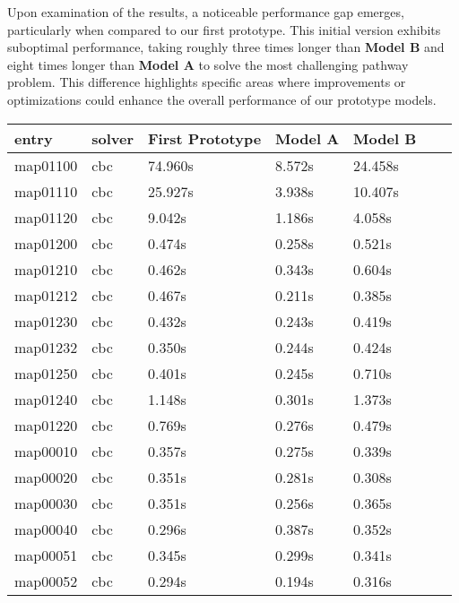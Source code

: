 Upon examination of the results, a noticeable performance gap emerges, particularly when compared to our first prototype. This initial version exhibits suboptimal performance, taking roughly three times longer than \textbf{Model B} and eight times longer than \textbf{Model A} to solve the most challenging pathway problem. This difference highlights specific areas where improvements or optimizations could enhance the overall performance of our prototype models.

\begin{table}[H]
\centering
\begin{tabular}{|l|l|l|l|l|l|l|}
\hline
\rowcolor[HTML]{C0C0C0} 
entry    & solver     & First Prototype & Model A & Model B  \\\hline
map01100 & cbc & 74.960s           & 8.572s        & 24.458s       \\\hline
map01110 & cbc & 25.927s          & 3.938s       & 10.407s       \\\hline
map01120 & cbc & 9.042s           & 1.186s       & 4.058s        \\\hline
map01200 & cbc & 0.474s         & 0.258s       & 0.521s        \\\hline
map01210 & cbc & 0.462s          & 0.343s      & 0.604s        \\\hline
map01212 & cbc & 0.467s          & 0.211s      & 0.385s       \\\hline
map01230 & cbc & 0.432s          & 0.243s      & 0.419s       \\\hline
map01232 & cbc & 0.350s          & 0.244s      & 0.424s      \\ \hline
map01250 & cbc & 0.401s          & 0.245s       & 0.710s       \\\hline
map01240 & cbc & 1.148s          & 0.301s       & 1.373s        \\\hline
map01220 & cbc & 0.769s          & 0.276s       & 0.479s       \\\hline
map00010 & cbc & 0.357s          & 0.275s      & 0.339s      \\\hline
map00020 & cbc & 0.351s          & 0.281s      & 0.308s      \\\hline
map00030 & cbc & 0.351s         & 0.256s       & 0.365s       \\\hline
map00040 & cbc & 0.296s         & 0.387s      & 0.352s        \\\hline
map00051 & cbc & 0.345s         & 0.299s       & 0.341s      \\\hline
map00052 & cbc & 0.294s          & 0.194s      & 0.316s       \\\hline

\end{tabular}
\end{table}
